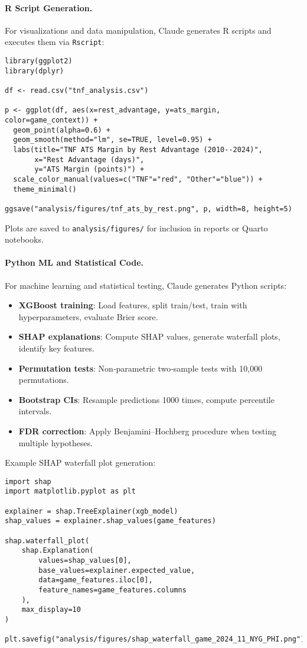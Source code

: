 \paragraph{R Script Generation.}
For visualizations and data manipulation, Claude generates R scripts and executes them via \texttt{Rscript}:
\begin{verbatim}
library(ggplot2)
library(dplyr)

df <- read.csv("tnf_analysis.csv")

p <- ggplot(df, aes(x=rest_advantage, y=ats_margin, color=game_context)) +
  geom_point(alpha=0.6) +
  geom_smooth(method="lm", se=TRUE, level=0.95) +
  labs(title="TNF ATS Margin by Rest Advantage (2010--2024)",
       x="Rest Advantage (days)",
       y="ATS Margin (points)") +
  scale_color_manual(values=c("TNF"="red", "Other"="blue")) +
  theme_minimal()

ggsave("analysis/figures/tnf_ats_by_rest.png", p, width=8, height=5)
\end{verbatim}
Plots are saved to \texttt{analysis/figures/} for inclusion in reports or Quarto notebooks.

\paragraph{Python ML and Statistical Code.}
For machine learning and statistical testing, Claude generates Python scripts:
\begin{itemize}
\item \textbf{XGBoost training}: Load features, split train/test, train with hyperparameters, evaluate Brier score.
\item \textbf{SHAP explanations}: Compute SHAP values, generate waterfall plots, identify key features.
\item \textbf{Permutation tests}: Non‑parametric two‑sample tests with 10,000 permutations.
\item \textbf{Bootstrap CIs}: Resample predictions 1000 times, compute percentile intervals.
\item \textbf{FDR correction}: Apply Benjamini--Hochberg procedure when testing multiple hypotheses.
\end{itemize}

Example SHAP waterfall plot generation:
\begin{verbatim}
import shap
import matplotlib.pyplot as plt

explainer = shap.TreeExplainer(xgb_model)
shap_values = explainer.shap_values(game_features)

shap.waterfall_plot(
    shap.Explanation(
        values=shap_values[0],
        base_values=explainer.expected_value,
        data=game_features.iloc[0],
        feature_names=game_features.columns
    ),
    max_display=10
)

plt.savefig("analysis/figures/shap_waterfall_game_2024_11_NYG_PHI.png")
\end{verbatim}

